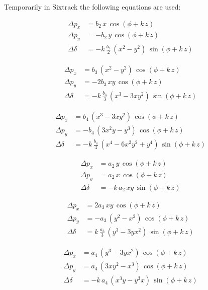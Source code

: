 \documentclass[english]{article}
\begin{document}
Temporarily in Sixtrack the following equations are used:

\begin{align}\Delta p_{x} & =b_{2}\, x\,\cos\left(\phi+k\, z\right)\\
\Delta p_{y} & =-b_{2}\, y\,\cos\left(\phi+k\, z\right)\\
\Delta\delta & =-k\,\frac{b_{2}}{2}\,\left(x^{2}-y^{2}\right)\,\sin\left(\phi+k\, z\right)
\end{align}

 \begin{align}\Delta p_{x} & =b_{3}\,\left(x^{2}-y^{2}\right)\,\cos\left(\phi+k\, z\right)\\
\Delta p_{y} & =-2b_{3}\, xy\,\cos\left(\phi+k\, z\right)\\
\Delta\delta & =-k\,\frac{b_{3}}{3}\,\left(x^{3}-3xy^{2}\right)\,\sin\left(\phi+k\, z\right)
\end{align}

 \begin{align}\Delta p_{x} & =b_{4}\,\left(x^{3}-3xy^{2}\right)\,\cos\left(\phi+k\, z\right)\\
\Delta p_{y} & =-b_{4}\,\left(3x^{2}y-y^{3}\right)\,\cos\left(\phi+k\, z\right)\\
\Delta\delta & =-k\,\frac{b_{4}}{4}\,\left(x^{4}-6x^{2}y^{2}+y^{4}\right)\,\sin\left(\phi+k\, z\right)
\end{align}

 \begin{align}\Delta p_{x} & =a_{2}\, y\,\cos\left(\phi+k\, z\right)\\
\Delta p_{y} & =a_{2}\, x\,\cos\left(\phi+k\, z\right)\\
\Delta\delta & =-k\, a_{2}\, xy\,\sin\left(\phi+k\, z\right)
\end{align}

 \begin{align}\Delta p_{x} & =2a_{3}\, xy\,\cos\left(\phi+k\, z\right)\\
\Delta p_{y} & =-a_{3}\,\left(y^{2}-x^{2}\right)\,\cos\left(\phi+k\, z\right)\\
\Delta\delta & =k\,\frac{a_{3}}{3}\,\left(y^{3}-3yx^{2}\right)\,\sin\left(\phi+k\, z\right)
\end{align}

 \begin{align}\Delta p_{x} & =a_{4}\,\left(y^{3}-3yx^{2}\right)\,\cos\left(\phi+k\, z\right)\\
\Delta p_{y} & =a_{4}\,\left(3xy^{2}-x^{3}\right)\,\cos\left(\phi+k\, z\right)\\
\Delta\delta & =-k\, a_{4}\,\left(x^{3}y-y^{3}x\right)\,\sin\left(\phi+k\, z\right)
\end{align}
 
\end{document}
